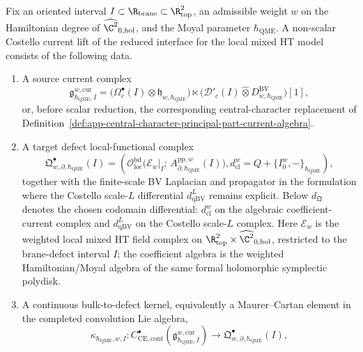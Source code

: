 \begin{defn}
\label{def:app-unreduced-nonscalar-current-lift-datum}
  Fix an oriented interval
  \(I\subset\R_{\mathrm{brane}}\subset\R^2_{\mathrm{top}}\), an
  admissible weight \(w\) on the Hamiltonian degree of
  \(\widehat{\C^2}_{0,\mathrm{hol}}\), and the Moyal parameter
  \(\hbar_{\mathrm{QME}}\).  A non-scalar Costello current lift of the reduced interface
  for the local mixed HT model consists of the following data.
  \begin{enumerate}
    \item A source current complex
    \[
      \mathfrak g^{w,\mathrm{cur}}_{\hbar_{\mathrm{QME}},I}
        =
        \bigl(\Omega^\bullet_c(I)\widehat\otimes
        \mathfrak h_{w,\hbar_{\mathrm{QME}}}\bigr)
        \ltimes
        \bigl(\mathcal D'_c(I)\widehat\otimes
        D^{\mathrm{BV}}_{w,\hbar_{\mathrm{QME}}}\bigr)[1],
    \]
    or, before scalar reduction, the corresponding central-character
    replacement of
    Definition~\ref{def:app-central-character-principal-part-current-algebra}.
    \item A target defect local-functional complex
    \[
      \mathfrak Q^\bullet_{w,\partial,\hbar_{\mathrm{QME}}}(I)
        =
        \left(
        \mathcal O_{\mathrm{loc}}^{\mathrm{bd}}\bigl(
          \mathcal E_w|_I;\,
          A^{\mathrm{pp},w}_{\partial,\hbar_{\mathrm{QME}}}(I)\bigr),
        d_{\mathrm{cl}}^w=Q+\{I_0^w,-\}_{\hbar_{\mathrm{QME}}}
        \right),
    \]
    together with the finite-scale BV Laplacian and propagator in the
    formulation where the Costello scale-\(L\) differential
    \(d_{\mathrm{qBV}}^L\) remains explicit.  Below
    \(d_{\mathfrak Q}\) denotes the chosen codomain differential:
    \(d_{\mathrm{cl}}^w\) on the algebraic coefficient-current complex
    and \(d_{\mathrm{qBV}}^L\) on the Costello scale-\(L\) complex.
    Here \(\mathcal E_w\) is the weighted local mixed HT field complex on
    \(\R^2_{\mathrm{top}}\times\widehat{\C^2}_{0,\mathrm{hol}}\),
    restricted to the brane-defect interval \(I\); the coefficient
    algebra is the weighted Hamiltonian/Moyal algebra of the same formal
    holomorphic symplectic polydisk.
    \item A continuous bulk-to-defect kernel, equivalently a Maurer--Cartan
    element in the completed convolution Lie algebra,
    \[
      \kappa_{\hbar_{\mathrm{QME}},w,I}\colon
      C^\bullet_{\mathrm{CE},\mathrm{cont}}
      (\mathfrak g^{w,\mathrm{cur}}_{\hbar_{\mathrm{QME}},I})
      \longrightarrow
      \mathfrak Q^\bullet_{w,\partial,\hbar_{\mathrm{QME}}}(I),
\]
\end{enumerate}
\end{defn}
